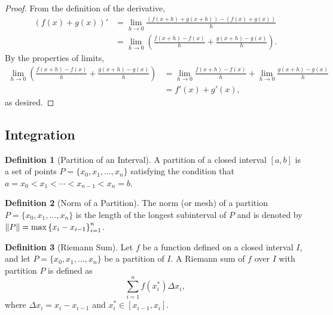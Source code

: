 \documentclass[headings=standardclasses]{scrartcl}
\theoremstyle{definition}
\newtheorem{definition}{Definition}[subsection]
\begin{document}
\begin{proof}
  From the definition of the derivative,
  \begin{equation*}
  \begin{split}
    (f(x) + g(x))' &= \lim_{h → 0} \frac{(f(x + h) + g(x + h)) - (f(x) + g(x))}{h} \\
                   &= \lim_{h → 0} \left(\frac{f(x + h) - f(x)}{h} + \frac{g(x + h) - g(x)}{h}\right).
  \end{split}
  \end{equation*}
  By the properties of limits,
  \begin{equation*}
  \begin{split}
    \lim_{h → 0} \left(\frac{f(x + h) - f(x)}{h} + \frac{g(x + h) - g(x)}{h}\right) &= \lim_{h → 0} \frac{f(x + h) - f(x)}{h} + \lim_{h → 0} \frac{g(x + h) - g(x)}{h} \\
                                                                                    &= f'(x) + g'(x),
  \end{split}
  \end{equation*}
  as desired.
\end{proof}

\subsection{Integration}

\begin{definition}[Partition of an Interval]
  A partition of a closed interval \([a, b]\) is a set of points \(P = \{x_0,
  x_1, \ldots, x_n\}\) satisfying the condition that \(a = x_0 < x_1 < \cdots <
  x_{n - 1} < x_n = b\).
\end{definition}

\begin{definition}[Norm of a Partition]
  The norm (or mesh) of a partition \(P = \{x_0, x_1, \ldots, x_n\}\) is the
  length of the longest subinterval of \(P\) and is denoted by \(\lVert P\rVert =
  \max{\{ x_i - x_{i - 1} \}}_{i = 1}^n\).
\end{definition}

\begin{definition}[Riemann Sum]
  Let \(f\) be a function defined on a closed interval \(I\), and let \(P =
  \{x_0, x_1, \ldots, x_n\}\) be a partition of \(I\). A Riemann sum of \(f\)
  over \(I\) with partition \(P\) is defined as \[ ∑_{i = 1}^n f(x^*_i) Δx_i,
  \] where \(Δx_i = x_i - x_{i - 1}\) and \(x^*_i ∈ [x_{i - 1}, x_i]\).
\end{definition}
\end{document}
